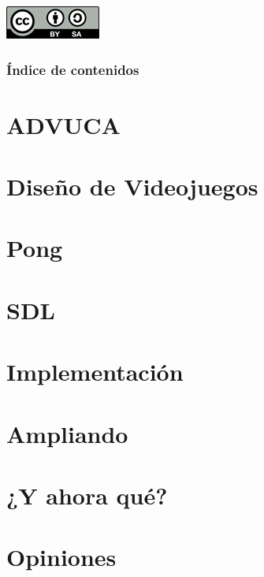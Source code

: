 \documentclass{beamer}
\begin{document}
\begin{frame}
    \begin{center}
        \includegraphics[scale=1]{img/cc.png}
    \end{center}    
\end{frame}

\begin{frame}
	\frametitle{Índice de contenidos}
	\tableofcontents
\end{frame}



\section{ADVUCA}



\section{Diseño de Videojuegos}


\section{Pong}


\section{SDL}


\section{Implementación}


\section{Ampliando}


\section{¿Y ahora qué?}


\section{Opiniones}

\end{document}
